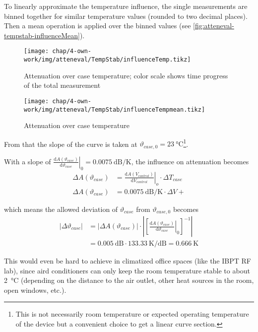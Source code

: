 To linearly approximate the temperature influence, the single measurements are binned together for similar temperature values (rounded to two decimal places). Then a mean operation is applied over the binned values (see \autoref{fig:atteneval-tempstab-influenceMean}).

\begin{figure}[tb]
	\centering
	\texttt{[image: chap/4-own-work/img/atteneval/TempStab/influenceTemp.tikz]}
	\caption{Attenuation over case temperature; color scale shows time progress of the total measurement}
	\label{fig:atteneval-tempstab-influence}
\end{figure}

\begin{figure}[tb]
	\centering
	\texttt{[image: chap/4-own-work/img/atteneval/TempStab/influenceTempmean.tikz]}
	\caption{Attenuation over case temperature}
	\label{fig:atteneval-tempstab-influenceMean}
\end{figure}

From that the slope of the curve is taken at $\vartheta_{case,0}=\SI{23}{\degreeCelsius}$\footnote{This is not necessarily room temperature or expected operating temperature of the device but a convenient choice to get a linear curve section.}.

With a slope of $\left.\frac{\text{d}A(\vartheta_{case})}{\text{d}\vartheta_{case}}\right|_{0} = \SI{0.0075}{\dB\per\kelvin}$, the influence on attenuation becomes
\begin{align}
\Delta A(\vartheta_{case}) &= \left.\frac{\text{d}A(V_{control})}{\text{d}V_{control}}\right|_{o} \cdot \Delta T_{case} \\
\Delta A(\vartheta_{case}) &= \SI{0.0075}{\dB\per\kelvin} \cdot \Delta V+
\end{align}

which means the allowed deviation of $\vartheta_{case}$ from $\vartheta_{case,0}$ becomes
\begin{align}\label{eq:atteneval-stabTemp}
\left|\Delta \vartheta_{case}\right| &= \left|\Delta A(\vartheta_{case})\right| \cdot 
\left|\left[\left.\frac{\text{d}A(\vartheta_{case})}{\text{d}\vartheta_{case}}\right|_{0}\right]^{-1}\right| \\
 &= \SI{0.005}{\dB} \cdot \SI{133.33}{\kelvin\per\dB} = \SI{0.666}{\kelvin}
\end{align}

This would even be hard to achieve in climatized office spaces (like the IBPT RF lab), since aird conditioners can only keep the room temperature stable to about \SI{2}{\degreeCelsius} (depending on the distance to the air outlet, other heat sources in the room, open windows, etc.).

